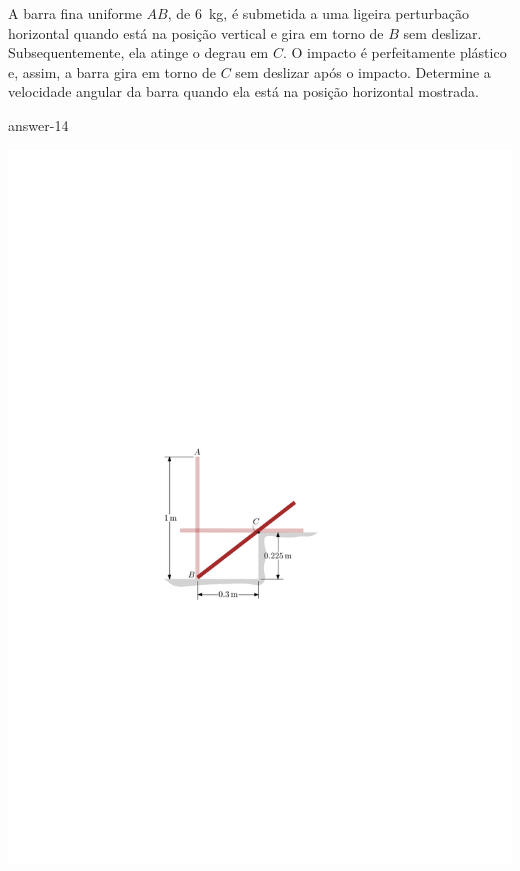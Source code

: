 \item A barra fina uniforme $AB$, de \SI{6}{\kilogram}, é submetida a uma ligeira perturbação horizontal quando está na posição vertical e gira em torno de $B$ sem deslizar. Subsequentemente, ela atinge o degrau em $C$. O impacto é perfeitamente plástico e, assim, a barra gira em torno de $C$ sem deslizar após o impacto. Determine a velocidade angular da barra quando ela está na posição horizontal mostrada.

{answer-14}

\vspace{-1.2cm}
\begin{flushright}
	\includegraphics[scale=1.25]{../../images/draw_14}
\end{flushright}
